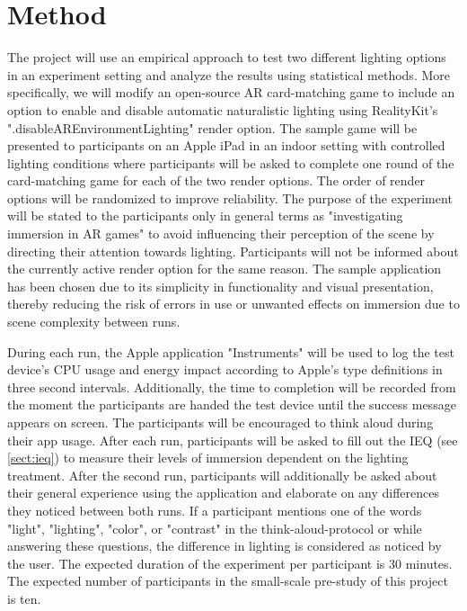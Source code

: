 \documentclass[12pt,twoside,english]{article}
\begin{document}
\section{Method}
\label{sect:method}

The project will use an empirical approach to test two different lighting options in an experiment setting and analyze the results using statistical methods.
More specifically, we will modify an open-source \gls{AR} card-matching game \cite{} to include an option to enable and disable automatic naturalistic lighting using RealityKit's ".disableAREnvironmentLighting" render option.
The sample game will be presented to participants on an Apple iPad in an indoor setting with controlled lighting conditions where participants will be asked to complete one round of the card-matching game for each of the two render options.
The order of render options will be randomized to improve reliability.
The purpose of the experiment will be stated to the participants only in general terms as "investigating immersion in \gls{AR} games" to avoid influencing their perception of the scene by directing their attention towards lighting.
Participants will not be informed about the currently active render option for the same reason.
The sample application has been chosen due to its simplicity in functionality and visual presentation, thereby reducing the risk of errors in use or unwanted effects on immersion due to scene complexity between runs.


During each run, the Apple application "Instruments" \cite{} will be used to log the test device's \gls{CPU} usage and energy impact according to Apple's type definitions \cite{} in three second intervals.
Additionally, the time to completion will be recorded from the moment the participants are handed the test device until the success message appears on screen.
The participants will be encouraged to think aloud \cite{} during their app usage.
After each run, participants will be asked to fill out the \gls{IEQ} (see \ref{sect:ieq}) to measure their levels of immersion dependent on the lighting treatment.
After the second run, participants will additionally be asked about their general experience using the application and elaborate on any differences they noticed between both runs.
If a participant mentions one of the words "light", "lighting", "color", or "contrast" in the think-aloud-protocol or while answering these questions, the difference in lighting is considered as noticed by the user.
The expected duration of the experiment per participant is 30 minutes.
The expected number of participants in the small-scale pre-study of this project is ten.
\end{document}
